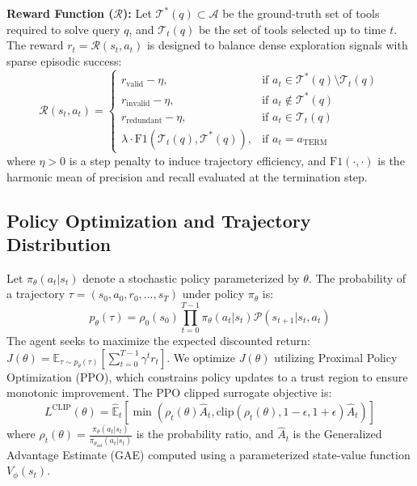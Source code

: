 \documentclass{article}
\begin{document}
\textbf{Reward Function ($\mathcal{R}$):} 
Let $\mathcal{T}^*(q) \subset \mathcal{A}$ be the ground-truth set of tools required to solve query $q$, and $\mathcal{T}_t(q)$ be the set of tools selected up to time $t$. The reward $r_t = \mathcal{R}(s_t, a_t)$ is designed to balance dense exploration signals with sparse episodic success:
\begin{equation}
\mathcal{R}(s_t, a_t) = 
\begin{cases} 
r_{\text{valid}} - \eta, & \text{if } a_t \in \mathcal{T}^*(q) \setminus \mathcal{T}_t(q) \\
r_{\text{invalid}} - \eta, & \text{if } a_t \notin \mathcal{T}^*(q) \\
r_{\text{redundant}} - \eta, & \text{if } a_t \in \mathcal{T}_t(q) \\
\lambda \cdot \text{F1}(\mathcal{T}_t(q), \mathcal{T}^*(q)), & \text{if } a_t = a_{\text{TERM}}
\end{cases}
\end{equation}
where $\eta > 0$ is a step penalty to induce trajectory efficiency, and $\text{F1}(\cdot, \cdot)$ is the harmonic mean of precision and recall evaluated at the termination step.

\subsection{Policy Optimization and Trajectory Distribution}
Let $\pi_\theta(a_t | s_t)$ denote a stochastic policy parameterized by $\theta$. The probability of a trajectory $\tau = (s_0, a_0, r_0, \dots, s_T)$ under policy $\pi_\theta$ is:
\begin{equation}
p_\theta(\tau) = \rho_0(s_0) \prod_{t=0}^{T-1} \pi_\theta(a_t | s_t) \mathcal{P}(s_{t+1} | s_t, a_t)
\end{equation}
The agent seeks to maximize the expected discounted return: $J(\theta) = \mathbb{E}_{\tau \sim p_\theta(\tau)} \left[ \sum_{t=0}^{T-1} \gamma^t r_t \right]$. We optimize $J(\theta)$ utilizing Proximal Policy Optimization (PPO), which constrains policy updates to a trust region to ensure monotonic improvement. The PPO clipped surrogate objective is:
\begin{equation}
L^{\text{CLIP}}(\theta) = \hat{\mathbb{E}}_t \left[ \min \left( \rho_t(\theta) \hat{A}_t, \text{clip}(\rho_t(\theta), 1-\epsilon, 1+\epsilon) \hat{A}_t \right) \right]
\end{equation}
where $\rho_t(\theta) = \frac{\pi_\theta(a_t | s_t)}{\pi_{\theta_{\text{old}}}(a_t | s_t)}$ is the probability ratio, and $\hat{A}_t$ is the Generalized Advantage Estimate (GAE) computed using a parameterized state-value function $V_\phi(s_t)$.
\end{document}
